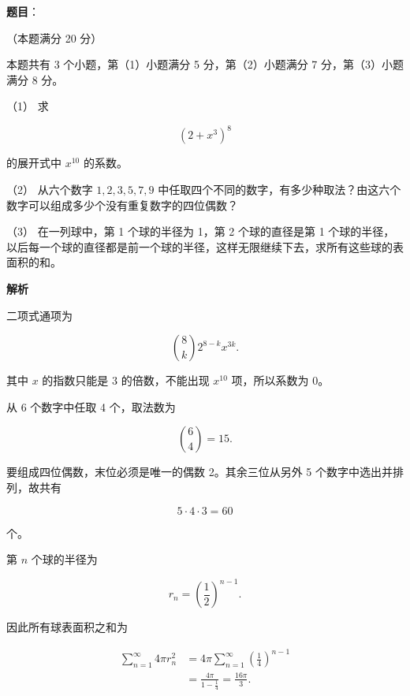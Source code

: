 \begin{answer}

\textbf{题目}：

（本题满分 20 分）

本题共有 3 个小题，第（1）小题满分 5 分，第（2）小题满分 7 分，第（3）小题满分 8 分。

（1） 求

\nopagebreak[4]
\[
(2+x^3)^8
\]

的展开式中 $x^{10}$ 的系数。

（2） 从六个数字 $1,2,3,5,7,9$ 中任取四个不同的数字，有多少种取法？由这六个数字可以组成多少个没有重复数字的四位偶数？

（3） 在一列球中，第 1 个球的半径为 1，第 2 个球的直径是第 1 个球的半径，以后每一个球的直径都是前一个球的半径，这样无限继续下去，求所有这些球的表面积的和。

\textbf{解析}


二项式通项为

\nopagebreak[4]
\[
\binom8k2^{8-k}x^{3k}.
\]

其中 $x$ 的指数只能是 3 的倍数，不能出现 $x^{10}$ 项，所以系数为 0。


从 6 个数字中任取 4 个，取法数为

\nopagebreak[4]
\[
\binom64=15.
\]

要组成四位偶数，末位必须是唯一的偶数 2。其余三位从另外 5 个数字中选出并排列，故共有

\nopagebreak[4]
\[
5\cdot4\cdot3=60
\]

个。


第 $n$ 个球的半径为

\nopagebreak[4]
\[
r_n=\left(\frac12\right)^{n-1}.
\]

因此所有球表面积之和为

\nopagebreak[4]
\[
\begin{aligned}
\sum_{n=1}^{\infty}4\pi r_n^2
&=4\pi\sum_{n=1}^{\infty}\left(\frac14\right)^{n-1}\\
&=\frac{4\pi}{1-\frac14}
=\frac{16\pi}{3}.
\end{aligned}
\]




\end{answer}
